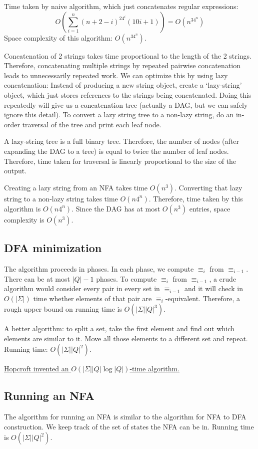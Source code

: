 Time taken by naive algorithm, which just concatenates regular expressions:
\[ O\left(\sum_{i=1}^n (n+2-i)^24^i(10i+1)\right) = O(n^34^n) \]
Space complexity of this algorithm: $O(n^34^n)$.

Concatenation of 2 strings takes time proportional to the length of the 2 strings.
Therefore, concatenating multiple strings by repeated pairwise concatenation leads to
unnecessarily repeated work.
We can optimize this by using lazy concatenation: Instead of producing a new string object,
create a `lazy-string' object, which just stores references to the strings being concatenated.
Doing this repeatedly will give us a concatenation tree (actually a DAG, but we can safely ignore this detail).
To convert a lazy string tree to a non-lazy string,
do an in-order traversal of the tree and print each leaf node.

A lazy-string tree is a full binary tree.
Therefore, the number of nodes (after expanding the DAG to a tree)
is equal to twice the number of leaf nodes.
Therefore, time taken for traversal is linearly proportional to the size of the output.

Creating a lazy string from an NFA takes time $O(n^3)$.
Converting that lazy string to a non-lazy string takes time $O(n4^n)$.
Therefore, time taken by this algorithm is $O(n4^n)$.
Since the DAG has at most $O(n^3)$ entries, space complexity is $O(n^3)$.

\subsection{DFA minimization}

The algorithm proceeds in phases.
In each phase, we compute $\equiv_i$ from $\equiv_{i-1}$.
There can be at most $|Q|-1$ phases.
To compute $\equiv_i$ from $\equiv_{i-1}$, a crude algorithm
would consider every pair in every set in $\equiv_{i-1}$
and it will check in $O(|\Sigma|)$ time whether elements of that
pair are $\equiv_i$-equivalent.
Therefore, a rough upper bound on running time is $O(|\Sigma||Q|^3)$.

A better algorithm: to split a set, take the first element and find out
which elements are similar to it. Move all those elements to a different set
and repeat. Running time: $O(|\Sigma||Q|^2)$.

\href{http://i.stanford.edu/pub/cstr/reports/cs/tr/71/190/CS-TR-71-190.pdf}{
Hopcroft invented an $O(|\Sigma||Q|\log|Q|)$-time algorithm.}

\subsection{Running an NFA}

The algorithm for running an NFA is similar to the algorithm for NFA to DFA construction.
We keep track of the set of states the NFA can be in.
Running time is $O(|\Sigma||Q|^2)$.


